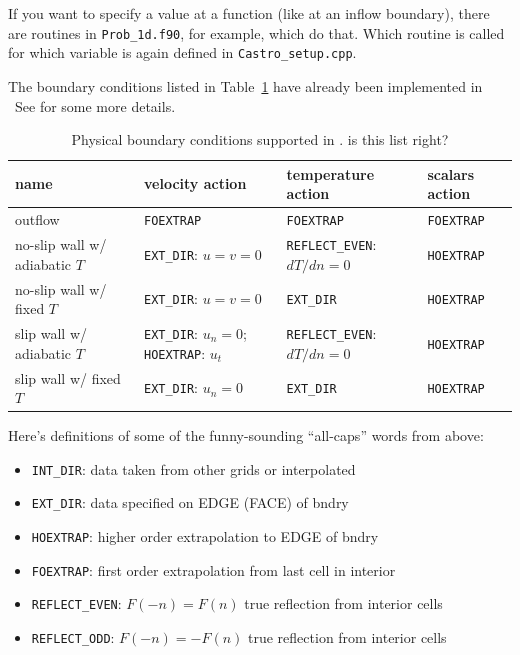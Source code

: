 If you want to specify a value at a function (like at an inflow
boundary), there are routines in {\tt Prob\_1d.f90}, for example, which do
that. Which routine is called for which variable is again defined in
{\tt Castro\_setup.cpp}.


The boundary conditions listed in Table~\ref{table:castro:bcs} have already been implemented in
\castro\ See  for some
more details.
\begin{table}
\renewcommand{\arraystretch}{1.5}
\centering
\begin{tabular}{p{2.0in}p{1.1in}p{1.1in}p{1.1in}}
{\bf name} & {\bf velocity action} & {\bf temperature action} & {\bf scalars action} \\
\hline
outflow  & {\tt FOEXTRAP} & {\tt FOEXTRAP} & {\tt FOEXTRAP} \\
no-slip wall w/ adiabatic $T$ & {\tt EXT\_DIR}: $u = v = 0$ &
                                   {\tt REFLECT\_EVEN}: $dT/dn=0$ &
                                   {\tt HOEXTRAP} \\
no-slip wall w/ fixed $T$ & {\tt EXT\_DIR}: $u=v=0$ &
                               {\tt EXT\_DIR} &
                               {\tt HOEXTRAP} \\
slip wall w/ adiabatic $T$ &
                               {\tt EXT\_DIR}: $u_n=0$; {\tt HOEXTRAP}: $u_t$ &
                               {\tt REFLECT\_EVEN}: $dT/dn=0$ &
                               {\tt HOEXTRAP} \\
slip wall w/ fixed $T$ &
                               {\tt EXT\_DIR}: $u_n=0$ &
                               {\tt EXT\_DIR} &
                               {\tt HOEXTRAP} \\
\end{tabular}
\caption[Physics boundary conditions in \castro]
  {\label{table:castro:bcs} Physical boundary conditions supported in \castro.  {\color{red} is this list right?}}
\renewcommand{\arraystretch}{1.0}
\end{table}

Here's definitions of some of the funny-sounding ``all-caps''
words from above:
\begin{itemize}
\item {\tt INT\_DIR}: data taken from other grids or interpolated

\item {\tt EXT\_DIR}: data specified on EDGE (FACE) of bndry

\item {\tt HOEXTRAP}: higher order extrapolation to EDGE of bndry

\item {\tt FOEXTRAP}: first order extrapolation from last cell in interior

\item {\tt REFLECT\_EVEN}: $F(-n) = F(n)$ true reflection from interior cells

\item {\tt REFLECT\_ODD}: $F(-n) = -F(n)$ true reflection from interior cells
\end{itemize}





